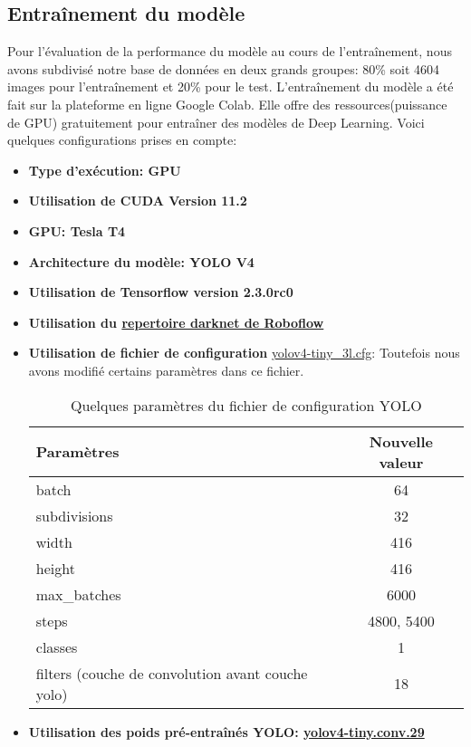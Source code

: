     \subsection{Entraînement du modèle}
    Pour l’évaluation de la performance du modèle au cours de l’entraînement, nous avons subdivisé notre base de données en deux grands groupes: 80\% soit 4604 images pour l’entraînement et 20\% pour le test. L’entraînement du modèle a été fait sur la plateforme en ligne Google Colab. Elle offre des ressources(puissance de GPU) gratuitement pour entraîner des modèles de Deep Learning. Voici quelques configurations prises en compte:
    \begin{itemize}
        \item \textbf{Type d'exécution: GPU}
        \item \textbf{Utilisation de CUDA Version 11.2}
        \item \textbf{GPU: Tesla T4}
        \item \textbf{Architecture du modèle: YOLO V4}
        \item \textbf{Utilisation de Tensorflow version 2.3.0rc0}
        \item \textbf{Utilisation du \href{https://github.com/roboflow-ai/darknet.git}{repertoire darknet de Roboflow}}
        \item \textbf{Utilisation de fichier de configuration} \href{https://github.com/AlexeyAB/darknet/blob/master/cfg/yolov4-tiny-3l.cfg}{yolov4-tiny\_3l.cfg}: Toutefois nous avons modifié certains paramètres dans ce fichier.
        \begin{table}[H]
            \centering
            \begin{tabular}{|l|c|}
                \hline
                \rowcolor{Gray}
                \textbf{Paramètres} & \textbf{Nouvelle valeur} \\ \hline
                batch & 64 \\ \hline
                subdivisions & 32 \\ \hline
                width & 416 \\ \hline
                height & 416 \\ \hline
                max\_batches & 6000 \\ \hline
                steps & 4800, 5400 \\ \hline
                classes & 1 \\ \hline
                filters (couche de convolution avant couche yolo) & 18 \\ \hline 
            \end{tabular}
            \caption{Quelques paramètres du fichier de configuration YOLO}
        \end{table}
        \item \textbf{Utilisation des poids pré-entraînés YOLO: \href{https://github.com/AlexeyAB/darknet/releases/download/darknet_yolo_v4_pre/yolov4-tiny.conv.29}{yolov4-tiny.conv.29}} 
    \end{itemize}
